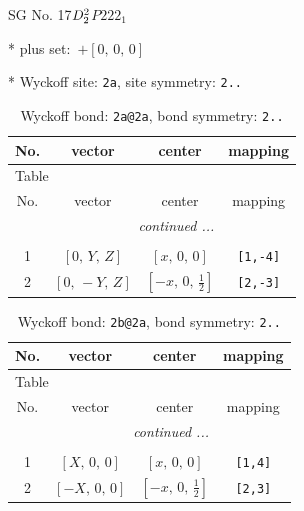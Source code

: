 \documentclass[fleqn,8pt]{jsarticle}
\begin{document}
\setcounter{MaxMatrixCols}{32}

\renewcommand{\tablename}{Table~}
\renewcommand{\figurename}{Figure~}
\begin{center}
\LARGE
SG No. 17\quad$D_{\rm 2}^{2}$\quad$P222_1$\quad[ orthorhombic ]
\end{center}

* plus set:\,\,\,$+\left[ 0,\, 0,\, 0 \right]$


* Wyckoff site: {\tt 2a}, site symmetry: {\tt 2..}
\renewcommand{\arraystretch}{1.2}
\begin{longtable}{cccc}
\caption{Wyckoff bond: {\tt 2a@2a}, bond symmetry: {\tt 2..}}
 \\
 \hline \hline
No. & vector & center & mapping \\ \hline \endfirsthead

\multicolumn{3}{l}{\tablename\ \thetable{}} \\
 \hline \hline
No. & vector & center & mapping \\ \hline \endhead

 \hline \hline
\multicolumn{3}{r}{\footnotesize\it continued ...} \\ \endfoot

 \hline \hline
\multicolumn{3}{r}{} \\ \endlastfoot

1 & $\left[ 0,\, Y,\, Z \right]$ & $\left[ x,\, 0,\, 0 \right]$ & {\tt [1,-4]} \\ \hline
2 & $\left[ 0,\, - Y,\, Z \right]$ & $\left[ - x,\, 0,\, \frac{1}{2} \right]$ & {\tt [2,-3]} \\
\end{longtable}
\renewcommand{\arraystretch}{1.2}
\begin{longtable}{cccc}
\caption{Wyckoff bond: {\tt 2b@2a}, bond symmetry: {\tt 2..}}
 \\
 \hline \hline
No. & vector & center & mapping \\ \hline \endfirsthead

\multicolumn{3}{l}{\tablename\ \thetable{}} \\
 \hline \hline
No. & vector & center & mapping \\ \hline \endhead

 \hline \hline
\multicolumn{3}{r}{\footnotesize\it continued ...} \\ \endfoot

 \hline \hline
\multicolumn{3}{r}{} \\ \endlastfoot

1 & $\left[ X,\, 0,\, 0 \right]$ & $\left[ x,\, 0,\, 0 \right]$ & {\tt [1,4]} \\ \hline
2 & $\left[ - X,\, 0,\, 0 \right]$ & $\left[ - x,\, 0,\, \frac{1}{2} \right]$ & {\tt [2,3]} \\
\end{longtable}
\end{document}
